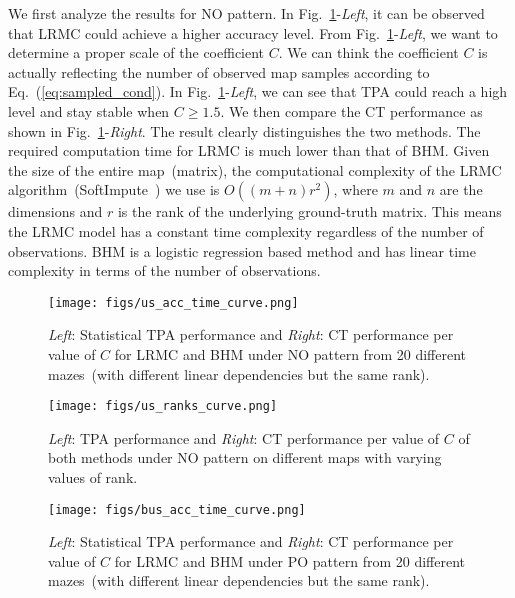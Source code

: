 We first analyze the results for NO pattern. In Fig.~\ref{fig:us_acc_time_curve}-\textit{Left}, it can be observed that 
LRMC could achieve a higher accuracy level. 
From Fig.~\ref{fig:us_acc_time_curve}-\textit{Left}, we want to determine a proper scale of the coefficient $C$. We can think the coefficient $C$ is actually reflecting the number of observed map samples according to Eq.~(\ref{eq:sampled_cond}). 
In Fig.~\ref{fig:us_acc_time_curve}-\textit{Left}, we can see that TPA could reach a high level and stay stable when $C\geq 1.5$.
We then compare the CT performance as shown in Fig.~\ref{fig:us_acc_time_curve}-\textit{Right}. The result clearly distinguishes the two methods. The required computation time for LRMC is much lower than that of BHM. Given the size of the entire map~(matrix), the computational complexity of the LRMC algorithm~(SoftImpute~\cite{mazumder2010spectral}) we use is $O((m+n)r^2)$, where $m$ and $n$ are the dimensions and $r$ is the rank of the underlying ground-truth matrix. This means the LRMC model has a constant time complexity regardless of the number of observations. BHM is a logistic regression based method and has linear time complexity in terms of the number of observations. 

\begin{figure} 
  \centering
  	{\label{fig:us_acc_time_curve}\texttt{[image: figs/us\_acc\_time\_curve.png]}}
  \caption{\small \textit{Left}: Statistical TPA performance and \textit{Right}: CT performance per value of $C$ for LRMC and BHM under NO pattern from 20 different mazes~(with different linear dependencies but the same rank). 
  } \vspace{-10pt}
\label{fig:us_acc_time_curve}  
\end{figure}

\begin{figure}%
  \centering
  	{\label{fig:us_ranks_curve}\texttt{[image: figs/us\_ranks\_curve.png]}}
  \caption{\small \textit{Left}: TPA performance and \textit{Right}: CT performance per value of $C$ of both methods under NO pattern on different maps with varying values of rank.
  } \vspace{-10pt}
\label{fig:us_ranks_curve}  
\end{figure}


\begin{figure}%
  \centering
  	{\label{fig:bus_acc_time_curve}\texttt{[image: figs/bus\_acc\_time\_curve.png]}}
  \caption{\small \textit{Left}: Statistical TPA performance and \textit{Right}: CT performance per value of $C$ for LRMC and BHM under PO pattern from 20 different mazes~(with different linear dependencies but the same rank).  
  } \vspace{-10pt}
\label{fig:bus_acc_time_curve}  
\end{figure}

